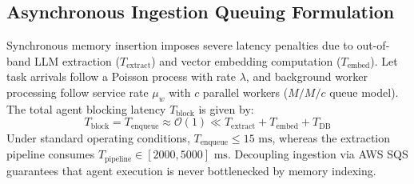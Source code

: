 \documentclass[lettersize,journal]{IEEEtran}
\begin{document}
\subsection{Asynchronous Ingestion Queuing Formulation}
Synchronous memory insertion imposes severe latency penalties due to out-of-band LLM extraction ($T_{\text{extract}}$) and vector embedding computation ($T_{\text{embed}}$). Let task arrivals follow a Poisson process with rate $\lambda$, and background worker processing follow service rate $\mu_w$ with $c$ parallel workers ($M/M/c$ queue model). The total agent blocking latency $T_{\text{block}}$ is given by:
\begin{equation}
\label{eq:blocking_latency}
T_{\text{block}} = T_{\text{enqueue}} \approx \mathcal{O}(1) \ll T_{\text{extract}} + T_{\text{embed}} + T_{\text{DB}}
\end{equation}
Under standard operating conditions, $T_{\text{enqueue}} \le 15\text{ ms}$, whereas the extraction pipeline consumes $T_{\text{pipeline}} \in [2000, 5000]\text{ ms}$. Decoupling ingestion via AWS SQS guarantees that agent execution is never bottlenecked by memory indexing.
\end{document}
